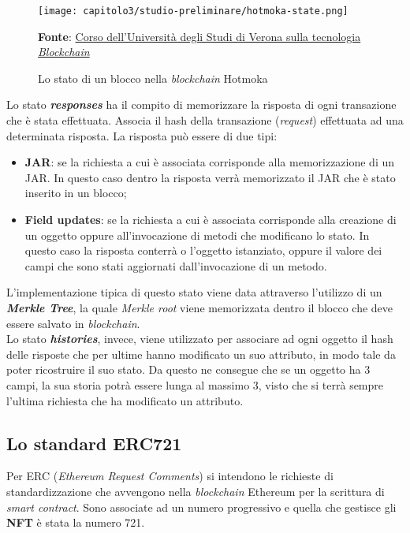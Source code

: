 \begin{figure}[h!]
  \centering
  \texttt{[image: capitolo3/studio-preliminare/hotmoka-state.png]}
  \caption{Lo stato di un blocco nella \textit{blockchain} Hotmoka}
  \textbf{Fonte}: \href{https://github.com/spoto/blockchain-course}{Corso dell'Università degli Studi di Verona sulla tecnologia \textit{Blockchain}}
\end{figure}

Lo stato \textbf{\textit{responses}} ha il compito di memorizzare la risposta di ogni transazione che è stata effettuata. Associa il hash della transazione (\textit{request}) effettuata ad una determinata risposta. 
La risposta può essere di due tipi:
\begin{itemize}
  \item \textbf{JAR}: se la richiesta a cui è associata corrisponde alla memorizzazione di un JAR. In questo caso dentro la risposta verrà memorizzato il JAR che è stato inserito in un blocco;
  \item \textbf{Field updates}: se la richiesta a cui è associata corrisponde alla creazione di un oggetto oppure all'invocazione di metodi che modificano lo stato. In questo caso la risposta conterrà o l'oggetto istanziato, oppure il valore dei campi che sono stati aggiornati dall'invocazione di un metodo.
\end{itemize}

L'implementazione tipica di questo stato viene data attraverso l'utilizzo di un \textbf{\textit{Merkle Tree}}, la quale \textit{Merkle root} viene memorizzata dentro il blocco che deve essere salvato in \textit{blockchain}. \\

Lo stato \textbf{\textit{histories}}, invece, viene utilizzato per associare ad ogni oggetto il hash delle risposte che per ultime hanno modificato un suo attributo, in modo tale da poter ricostruire il suo stato. Da questo ne consegue che se un oggetto ha 3 campi, la sua storia potrà essere lunga al massimo 3, visto che si terrà sempre l'ultima richiesta che ha modificato un attributo.


\subsection{Lo standard ERC721}
Per ERC (\textit{Ethereum Request Comments}) si intendono le richieste di standardizzazione che avvengono nella \textit{blockchain} Ethereum per la scrittura di \textit{smart contract}. Sono associate ad un numero progressivo e quella che gestisce gli \textbf{NFT} è stata la numero 721. \\

